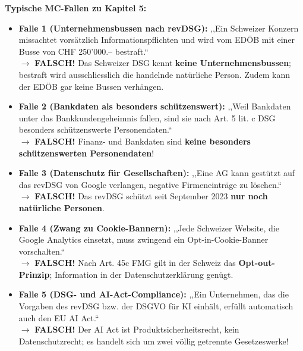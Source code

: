 \begin{important}
    \textbf{Typische MC-Fallen zu Kapitel 5:}
    \begin{itemize}
        \item \textbf{Falle 1 (Unternehmensbussen nach revDSG):} ,,Ein Schweizer Konzern missachtet vorsätzlich Informationspflichten und wird vom EDÖB mit einer Busse von CHF 250'000.-- bestraft.`` \\
        $\rightarrow$ \textbf{FALSCH!} Das Schweizer DSG kennt \textbf{keine Unternehmensbussen}; bestraft wird ausschliesslich die handelnde natürliche Person. Zudem kann der EDÖB gar keine Bussen verhängen.
        \item \textbf{Falle 2 (Bankdaten als besonders schützenswert):} ,,Weil Bankdaten unter das Bankkundengeheimnis fallen, sind sie nach Art. 5 lit. c DSG besonders schützenswerte Personendaten.`` \\
        $\rightarrow$ \textbf{FALSCH!} Finanz- und Bankdaten sind \textbf{keine besonders schützenswerten Personendaten}!
        \item \textbf{Falle 3 (Datenschutz für Gesellschaften):} ,,Eine AG kann gestützt auf das revDSG von Google verlangen, negative Firmeneinträge zu löschen.`` \\
        $\rightarrow$ \textbf{FALSCH!} Das revDSG schützt seit September 2023 \textbf{nur noch natürliche Personen}.
        \item \textbf{Falle 4 (Zwang zu Cookie-Bannern):} ,,Jede Schweizer Website, die Google Analytics einsetzt, muss zwingend ein Opt-in-Cookie-Banner vorschalten.`` \\
        $\rightarrow$ \textbf{FALSCH!} Nach Art. 45c FMG gilt in der Schweiz das \textbf{Opt-out-Prinzip}; Information in der Datenschutzerklärung genügt.
        \item \textbf{Falle 5 (DSG- und AI-Act-Compliance):} ,,Ein Unternehmen, das die Vorgaben des revDSG bzw. der DSGVO für KI einhält, erfüllt automatisch auch den EU AI Act.`` \\
        $\rightarrow$ \textbf{FALSCH!} Der AI Act ist Produktsicherheitsrecht, kein Datenschutzrecht; es handelt sich um zwei völlig getrennte Gesetzeswerke!
    \end{itemize}
\end{important}
